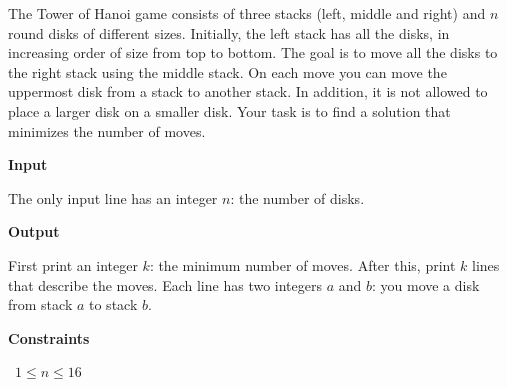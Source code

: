 The Tower of Hanoi game consists of three stacks (left, middle and right) and $n$ round disks of different sizes. Initially, the left stack has all the disks, in increasing order of size from top to bottom.
The goal is to move all the disks to the right stack using the middle stack. On each move you can move the uppermost disk from a stack to another stack. In addition, it is not allowed to place a larger disk on a smaller disk.
Your task is to find a solution that minimizes the number of moves.

\vspace{0.3cm}\noindent\textbf{Input}

The only input line has an integer $n$: the number of disks.

\vspace{0.3cm}\noindent\textbf{Output}

First print an integer $k$: the minimum number of moves.
After this, print $k$ lines that describe the moves. Each line has two integers $a$ and $b$: you move a disk from stack $a$ to stack $b$.

\vspace{0.3cm}\noindent\textbf{Constraints}

\textbullet\ $1 \le n \le 16$